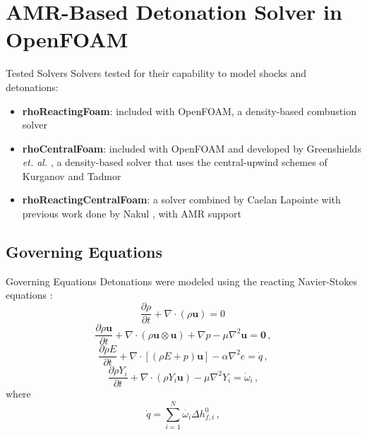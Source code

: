 \section{AMR-Based Detonation Solver in OpenFOAM}


\begin{frame}{Tested Solvers}
Solvers tested for their capability to model shocks and detonations:
\begin{itemize}
\item \textbf{rhoReactingFoam}: included with OpenFOAM, a density-based combustion solver
\item \textbf{rhoCentralFoam}: included with OpenFOAM and developed by Greenshields \textit{et. al.} \cite{greenshields}, a density-based solver that uses the central-upwind schemes of Kurganov and Tadmor \cite{kurganov1} 
\item \textbf{rhoReactingCentralFoam}: a solver combined by Caelan Lapointe with previous work done by Nakul \cite{nakul}, with AMR support
\end{itemize}
\end{frame}

\subsection{Governing Equations}

\begin{frame}[allowframebreaks]{Governing Equations}
Detonations were modeled using the reacting Navier-Stokes equations \cite{kuo,stokes}:
\begin{equation}
\frac{\partial \rho}{\partial t} + \nabla \cdot \left(\rho \bm{u}\right) = 0\,
\end{equation}
\begin{equation}
\frac{\partial \rho\bm{u}}{\partial t} + \nabla \cdot \left(\rho \bm{u}\otimes \bm{u}\right) + \nabla p -\mu\nabla^2\bm{u}= \bm{0}\,,
\end{equation}
\begin{equation}
\frac{\partial \rho E}{\partial t} + \nabla \cdot \left[\left(\rho E + p\right)\bm{u}\right] -\alpha\nabla^2 e = \dot{q}\,,
\end{equation}
\begin{equation}
\frac{\partial \rho Y_i}{\partial t} + \nabla \cdot \left(\rho Y_i \bm{u}\right) -\mu\nabla^2 Y_i= \dot{\omega}_i\,,
\end{equation}
where 
\begin{equation}
\dot{q} = \sum_{i = 1}^N \dot{\omega_i} \Delta h_{f,i}^0\,,
\end{equation}
\end{frame}



